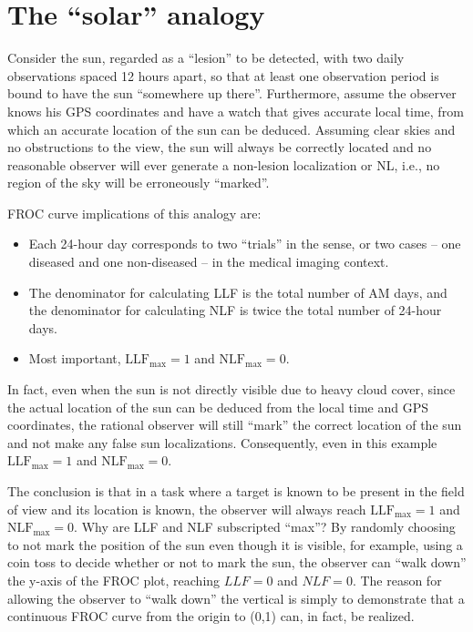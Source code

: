 \documentclass[
]{book}
\providecommand{\tightlist}{%
  \setlength{\itemsep}{0pt}\setlength{\parskip}{0pt}}
\begin{document}
\hypertarget{froc-paradigm-solar-analogy}{%
\section{The ``solar'' analogy}\label{froc-paradigm-solar-analogy}}

Consider the sun, regarded as a ``lesion'' to be detected, with two daily observations spaced 12 hours apart, so that at least one observation period is bound to have the sun ``somewhere up there''. Furthermore, assume the observer knows his GPS coordinates and have a watch that gives accurate local time, from which an accurate location of the sun can be deduced. Assuming clear skies and no obstructions to the view, the sun will always be correctly located and no reasonable observer will ever generate a non-lesion localization or NL, i.e., no region of the sky will be erroneously ``marked''.

FROC curve implications of this analogy are:

\begin{itemize}
\tightlist
\item
  Each 24-hour day corresponds to two ``trials'' in the \citep{RN897} sense, or two cases -- one diseased and one non-diseased -- in the medical imaging context.
\item
  The denominator for calculating LLF is the total number of AM days, and the denominator for calculating NLF is twice the total number of 24-hour days.
\item
  Most important, \(\text{LLF}_{\text{max}} = 1\) and \(\text{NLF}_{\text{max}} = 0\).
\end{itemize}

In fact, even when the sun is not directly visible due to heavy cloud cover, since the actual location of the sun can be deduced from the local time and GPS coordinates, the rational observer will still ``mark'' the correct location of the sun and not make any false sun localizations. Consequently, even in this example \(\text{LLF}_{\text{max}} = 1\) and \(\text{NLF}_{\text{max}} = 0\).

The conclusion is that in a task where a target is known to be present in the field of view and its location is known, the observer will always reach \(\text{LLF}_{\text{max}} = 1\) and \(\text{NLF}_{\text{max}} = 0\). Why are LLF and NLF subscripted ``max''? By randomly choosing to not mark the position of the sun even though it is visible, for example, using a coin toss to decide whether or not to mark the sun, the observer can ``walk down'' the y-axis of the FROC plot, reaching \(LLF = 0\) and \(NLF = 0\). The reason for allowing the observer to ``walk down'' the vertical is simply to demonstrate that a continuous FROC curve from the origin to (0,1) can, in fact, be realized.
\end{document}

